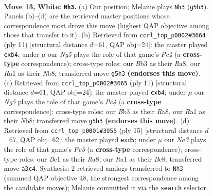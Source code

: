 \documentclass[11pt]{article}
\begin{document}
\clearpage

\begin{figure}[p]\centering
\begin{subfigure}{0.46\textwidth}\centering
\resizebox{\linewidth}{!}{%
\newchessgame
\chessboard[
  setfen={rnbqk2r/ppp1b3/1n3pp1/3p2Np/P2P4/NB6/1PP2PPP/R1BQR1K1 w kq - 2 13},
  showmover=false,
  pgfstyle=straightmove, color=movearrow, markmove={g5-h3}
]}
\caption{}
\end{subfigure}\hfill
\begin{subfigure}{0.46\textwidth}\centering
\resizebox{\linewidth}{!}{%
\newchessgame
\chessboard[
  setfen={rnbqkb1r/pp2pppp/5n2/2p5/1PP5/4PN2/PB1P2PP/RN1QKB1R b KQkq - 0 6},
  showmover=false,
  pgfstyle=straightmove, color=movearrow, markmove={c5-b4}
]}
\caption{}
\end{subfigure}
\\[4pt]
\begin{subfigure}{0.46\textwidth}\centering
\resizebox{\linewidth}{!}{%
\newchessgame
\chessboard[
  setfen={rnbqkb1r/pp2pppp/5n2/2p5/1PP5/4PN2/PB1P2PP/RN1QKB1R b KQkq - 0 6},
  showmover=false,
  pgfstyle=straightmove, color=movearrow, markmove={c5-b4}
]}
\caption{}
\end{subfigure}\hfill
\begin{subfigure}{0.46\textwidth}\centering
\resizebox{\linewidth}{!}{%
\newchessgame
\chessboard[
  setfen={r1bqk1nr/pp3ppp/1bn1p3/3P4/8/1N4P1/PP2PPBP/RNBQK2R b KQkq - 0 8},
  showmover=false,
  pgfstyle=straightmove, color=movearrow, markmove={e6-d5}
]}
\caption{}
\end{subfigure}
\caption{\textbf{Move 13, White: \texttt{Nh3}.} (a) Our position; Melanie plays \texttt{Nh3} (\texttt{g5h3}). Panels (b)--(d) are the retrieved master positions whose correspondence most drove this move (highest QAP objective among those that transfer to it). (b) Retrieved from \texttt{ccrl\_top\_p0002\#3664} (ply 11) [structural distance $d$=61, QAP obj=24]: the master played \texttt{cxb4}; under $\mu$ our \emph{Ng5} plays the role of that game's \emph{Pc4} (a \textbf{cross-type} correspondence); cross-type roles: our \emph{B}b3 as their \emph{R}a8, our \emph{R}a1 as their \emph{N}b8; transferred move \texttt{g5h3} \textbf{(endorses this move)}. (c) Retrieved from \texttt{ccrl\_top\_p0002\#3665} (ply 11) [structural distance $d$=61, QAP obj=24]: the master played \texttt{cxb4}; under $\mu$ our \emph{Ng5} plays the role of that game's \emph{Pc4} (a \textbf{cross-type} correspondence); cross-type roles: our \emph{B}b3 as their \emph{R}a8, our \emph{R}a1 as their \emph{N}b8; transferred move \texttt{g5h3} \textbf{(endorses this move)}. (d) Retrieved from \texttt{ccrl\_top\_p0001\#3955} (ply 15) [structural distance $d$=67, QAP obj=62]: the master played \texttt{exd5}; under $\mu$ our \emph{Na3} plays the role of that game's \emph{Pe3} (a \textbf{cross-type} correspondence); cross-type roles: our \emph{B}c1 as their \emph{R}a8, our \emph{R}a1 as their \emph{B}c8; transferred move \texttt{a3c4}. Synthesis: 2 retrieved analogs transferred to \texttt{Nh3} (summed QAP objective 48, the strongest correspondence among the candidate moves); Melanie committed it via the \texttt{search} selector.}
\label{fig:thought-m24}
\end{figure}
\end{document}
